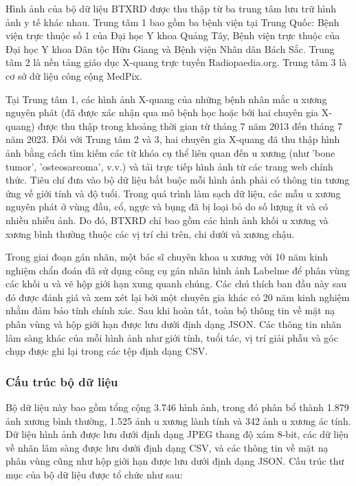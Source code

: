 Hình ảnh của bộ dữ liệu BTXRD được thu thập từ ba trung tâm lưu trữ hình ảnh y tế khác nhau. Trung tâm 1 bao gồm ba bệnh viện tại Trung Quốc: Bệnh viện trực thuộc số 1 của Đại học Y khoa Quảng Tây, Bệnh viện trực thuộc của Đại học Y khoa Dân tộc Hữu Giang và Bệnh viện Nhân dân Bách Sắc. Trung tâm 2 là nền tảng giáo dục X-quang trực tuyến Radiopaedia.org. Trung tâm 3 là cơ sở dữ liệu công cộng MedPix. 

Tại Trung tâm 1, các hình ảnh X-quang của những bệnh nhân mắc u xương nguyên phát (đã được xác nhận qua mô bệnh học hoặc bởi hai chuyên gia X-quang) được thu thập trong khoảng thời gian từ tháng 7 năm 2013 đến tháng 7 năm 2023. Đối với Trung tâm 2 và 3, hai chuyên gia X-quang đã thu thập hình ảnh bằng cách tìm kiếm các từ khóa cụ thể liên quan đến u xương (như 'bone tumor', 'osteosarcoma', v.v.) và tải trực tiếp hình ảnh từ các trang web chính thức. Tiêu chí đưa vào bộ dữ liệu bắt buộc mỗi hình ảnh phải có thông tin tương ứng về giới tính và độ tuổi. Trong quá trình làm sạch dữ liệu, các mẫu u xương nguyên phát ở vùng đầu, cổ, ngực và bụng đã bị loại bỏ do số lượng ít và có nhiều nhiễu ảnh. Do đó, BTXRD chỉ bao gồm các hình ảnh khối u xương và xương bình thường thuộc các vị trí chi trên, chi dưới và xương chậu. 

Trong giai đoạn gán nhãn, một bác sĩ chuyên khoa u xương với 10 năm kinh nghiệm chẩn đoán đã sử dụng công cụ gán nhãn hình ảnh Labelme \cite{russell2008labelme} để phân vùng các khối u và vẽ hộp giới hạn xung quanh chúng. Các chú thích ban đầu này sau đó được đánh giá và xem xét lại bởi một chuyên gia khác có 20 năm kinh nghiệm nhằm đảm bảo tính chính xác. Sau khi hoàn tất, toàn bộ thông tin về mặt nạ phân vùng và hộp giới hạn được lưu dưới định dạng JSON. Các thông tin nhãn lâm sàng khác của mỗi hình ảnh như giới tính, tuổi tác, vị trí giải phẫu và góc chụp được ghi lại trong các tệp định dạng CSV.

\subsubsection{Cấu trúc bộ dữ liệu}
Bộ dữ liệu này bao gồm tổng cộng 3.746 hình ảnh, trong đó phân bổ thành 1.879 ảnh xương bình thường, 1.525 ảnh u xương lành tính và 342 ảnh u xương ác tính. Dữ liệu hình ảnh được lưu dưới định dạng JPEG thang độ xám 8-bit, các dữ liệu về nhãn lâm sàng được lưu dưới định dạng CSV, và các thông tin về mặt nạ phân vùng cũng như hộp giới hạn được lưu dưới định dạng JSON. Cấu trúc thư mục của bộ dữ liệu được tổ chức như sau:

